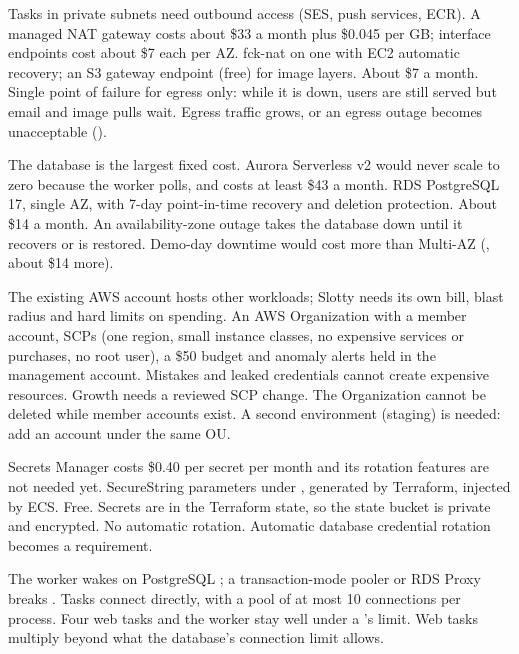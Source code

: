   {Tasks in private subnets need outbound access (SES, push services, ECR). A managed NAT gateway
   costs about \$33 a month plus \$0.045 per GB; interface endpoints cost about \$7 each per AZ.}
  {fck-nat on one  with EC2 automatic recovery; an S3 gateway endpoint (free) for
   image layers.}
  {About \$7 a month. Single point of failure for egress only: while it is down, users are still
   served but email and image pulls wait.}
  {Egress traffic grows, or an egress outage becomes unacceptable ().}

  {The database is the largest fixed cost. Aurora Serverless v2 would never scale to zero because
   the worker polls, and costs at least \$43 a month.}
  {RDS PostgreSQL 17, single AZ, with 7-day point-in-time recovery and deletion protection.}
  {About \$14 a month. An availability-zone outage takes the database down until it recovers or
   is restored.}
  {Demo-day downtime would cost more than Multi-AZ (, about \$14 more).}

  {The existing AWS account hosts other workloads; Slotty needs its own bill, blast radius and
   hard limits on spending.}
  {An AWS Organization with a  member account, SCPs (one region, small
   instance classes, no expensive services or purchases, no root user), a \$50 budget and anomaly
   alerts held in the management account.}
  {Mistakes and leaked credentials cannot create expensive resources. Growth needs a reviewed
   SCP change. The Organization cannot be deleted while member accounts exist.}
  {A second environment (staging) is needed: add an account under the same OU.}

  {Secrets Manager costs \$0.40 per secret per month and its rotation features are not needed yet.}
  {SecureString parameters under , generated by Terraform, injected by ECS.}
  {Free. Secrets are in the Terraform state, so the state bucket is private and encrypted. No
   automatic rotation.}
  {Automatic database credential rotation becomes a requirement.}

  {The worker wakes on PostgreSQL ; a transaction-mode pooler or RDS Proxy breaks
   .}
  {Tasks connect directly, with a pool of at most 10 connections per process.}
  {Four web tasks and the worker stay well under a 's limit.}
  {Web tasks multiply beyond what the database's connection limit allows.}

